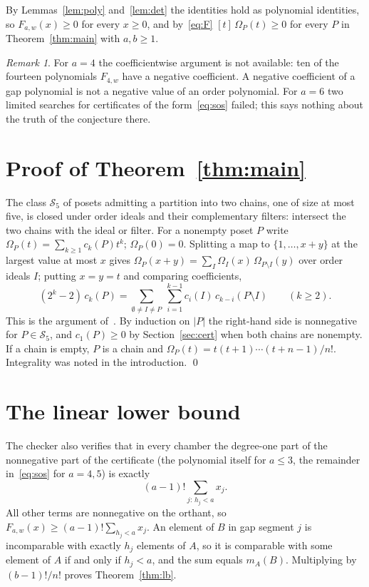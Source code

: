 \documentclass[11pt]{article}
\theoremstyle{definition}
\theoremstyle{remark}
\newtheorem{remark}[theorem]{Remark}
\begin{document}
By Lemmas~\ref{lem:poly} and~\ref{lem:det} the identities hold as
polynomial identities, so $F_{a,w}(x)\ge0$ for every $x\ge0$, and
by~\eqref{eq:F} $[t]\,\Omega_P(t)\ge0$ for every $P$ in
Theorem~\ref{thm:main} with $a,b\ge1$.

\begin{remark}
For $a=4$ the coefficientwise argument is not available: ten of the
fourteen polynomials $F_{4,w}$ have a negative coefficient. A negative
coefficient of a gap polynomial is not a negative value of an order
polynomial. For $a=6$ two limited searches for certificates of the
form~\eqref{eq:sos} failed; this says nothing about the truth of the
conjecture there.
\end{remark}

\section{Proof of Theorem~\ref{thm:main}}\label{sec:proof}

The class $\mathcal S_5$ of posets admitting a partition into two chains,
one of size at most five, is closed under order ideals and their
complementary filters: intersect the two chains with the ideal or
filter. For a nonempty poset $P$ write $\Omega_P(t)=\sum_{k\ge1}c_k(P)t^k$;
$\Omega_P(0)=0$. Splitting a map to $\{1,\dots,x+y\}$ at the largest
value at most $x$ gives
$\Omega_P(x+y)=\sum_I\Omega_I(x)\,\Omega_{P\setminus I}(y)$ over order
ideals $I$; putting $x=y=t$ and comparing coefficients,
\begin{equation}\label{eq:red}
(2^k-2)\,c_k(P)=\sum_{\emptyset\ne I\ne P}\ \sum_{i=1}^{k-1}c_i(I)\,c_{k-i}(P\setminus I)\qquad(k\ge2).
\end{equation}
This is the argument of~\cite[Proposition~3.3, Theorem~3.4]{FMP}. By
induction on $|P|$ the right-hand side is nonnegative for $P\in\mathcal
S_5$, and $c_1(P)\ge0$ by Section~\ref{sec:cert} when both chains are
nonempty. If a chain is empty, $P$ is a chain and
$\Omega_P(t)=t(t+1)\cdots(t+n-1)/n!$. Integrality was noted in the
introduction. \qed

\section{The linear lower bound}\label{sec:lb}

The checker also verifies that in every chamber the degree-one part of
the nonnegative part of the certificate (the polynomial itself for
$a\le3$, the remainder in~\eqref{eq:sos} for $a=4,5$) is exactly
\[
(a-1)!\sum_{j:\,h_j<a}x_j .
\]
All other terms are nonnegative on the orthant, so
$F_{a,w}(x)\ge(a-1)!\sum_{h_j<a}x_j$. An element of $B$ in gap segment
$j$ is incomparable with exactly $h_j$ elements of $A$, so it is
comparable with some element of $A$ if and only if $h_j<a$, and the sum
equals $m_A(B)$. Multiplying by $(b-1)!/n!$ proves Theorem~\ref{thm:lb}.
\end{document}
